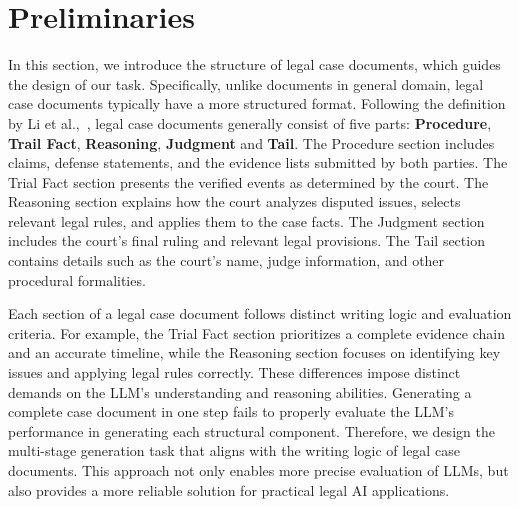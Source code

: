 
\section{Preliminaries}
\label{sec:pre}

In this section, we introduce the structure of legal case documents, which guides the design of our task. 
Specifically, unlike documents in general domain, legal case documents typically have a more structured format. Following the definition by Li et al.,~\cite{li2023sailer}, legal case documents generally consist of five parts: \textbf{Procedure}, \textbf{Trail Fact}, \textbf{Reasoning}, \textbf{Judgment} and \textbf{Tail}.
The Procedure section includes claims, defense statements, and the evidence lists submitted by both parties.
The Trial Fact section presents the verified events as determined by the court.
The Reasoning section explains how the court analyzes disputed issues, selects relevant legal rules, and applies them to the case facts.
The Judgment section includes the court's final ruling and relevant legal provisions.
The Tail section contains details such as the court's name, judge information, and other procedural formalities.


Each section of a legal case document follows distinct writing logic and evaluation criteria. For example, the Trial Fact section prioritizes a complete evidence chain and an accurate timeline, while the Reasoning section focuses on identifying key issues and applying legal rules correctly.
These differences impose distinct demands on the LLM’s understanding and reasoning abilities. Generating a complete case document in one step fails to properly evaluate the LLM's performance in generating each structural component.
Therefore, we design the multi-stage generation task that aligns with the writing logic of legal case documents.
This approach not only enables more precise evaluation of LLMs, but also provides a more reliable solution for practical legal AI applications.





